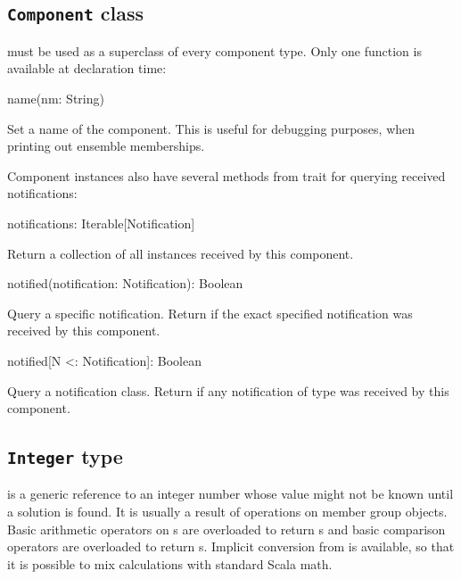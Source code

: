 
\subsection{\texttt{Component} class}
\label{dsl:r:component}

 must be used as a superclass of every component type. Only one function
is available at declaration time:

\begin{dslsig}
name(nm: String)
\end{dslsig}
\begin{dsldesc}
    Set a name of the component. This is useful for debugging purposes, when printing
    out ensemble memberships.
\end{dsldesc}

\medskip

\noindent
Component instances also have several methods from trait  for querying
received notifications:

\begin{dslsig}
notifications: Iterable[Notification]
\end{dslsig}
\begin{dsldesc}
    Return a collection of all  instances received by this component.
\end{dsldesc}

\begin{dslsig}
notified(notification: Notification): Boolean
\end{dslsig}
\begin{dsldesc}
    Query a specific notification. Return  if the exact specified notification
    was received by this component.
\end{dsldesc}

\begin{dslsig}
notified[N <: Notification]: Boolean
\end{dslsig}
\begin{dsldesc}
    Query a notification class. Return  if any notification of type  was
    received by this component.
\end{dsldesc}


\subsection{\texttt{Integer} type}

 is a generic reference to an integer number whose value might not be known
until a solution is found. It is usually a result of operations on member group objects.
Basic arithmetic operators on s are overloaded to return s and
basic comparison operators are overloaded to return s. Implicit conversion
from  is available, so that it is possible to mix  calculations with
standard Scala math.


